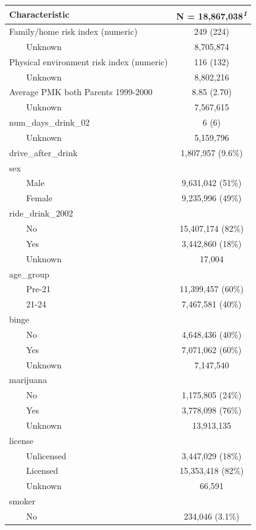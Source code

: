 \documentclass[
]{article}
\begin{document}
\begin{table}[t]
\fontsize{12.0pt}{14.0pt}\selectfont
\begin{tabular*}{\linewidth}{@{\extracolsep{\fill}}lc}
\toprule
\textbf{Characteristic} & \textbf{N = 18,867,038}\textsuperscript{\textit{1}} \\ 
\midrule\addlinespace[2.5pt]
Family/home risk index (numeric) & 249 (224) \\ 
    Unknown & 8,705,874 \\ 
Physical environment risk index (numeric) & 116 (132) \\ 
    Unknown & 8,802,216 \\ 
Average PMK both Parents 1999-2000 & 8.85 (2.70) \\ 
    Unknown & 7,567,615 \\ 
num\_days\_drink\_02 & 6 (6) \\ 
    Unknown & 5,159,796 \\ 
drive\_after\_drink & 1,807,957 (9.6\%) \\ 
sex &  \\ 
    Male & 9,631,042 (51\%) \\ 
    Female & 9,235,996 (49\%) \\ 
ride\_drink\_2002 &  \\ 
    No & 15,407,174 (82\%) \\ 
    Yes & 3,442,860 (18\%) \\ 
    Unknown & 17,004 \\ 
age\_group &  \\ 
    Pre-21 & 11,399,457 (60\%) \\ 
    21-24 & 7,467,581 (40\%) \\ 
binge &  \\ 
    No & 4,648,436 (40\%) \\ 
    Yes & 7,071,062 (60\%) \\ 
    Unknown & 7,147,540 \\ 
marijuana &  \\ 
    No & 1,175,805 (24\%) \\ 
    Yes & 3,778,098 (76\%) \\ 
    Unknown & 13,913,135 \\ 
license &  \\ 
    Unlicensed & 3,447,029 (18\%) \\ 
    Licensed & 15,353,418 (82\%) \\ 
    Unknown & 66,591 \\ 
smoker &  \\ 
    No & 234,046 (3.1\%) \\ 

\end{tabular*}
\end{table}
\end{document}
